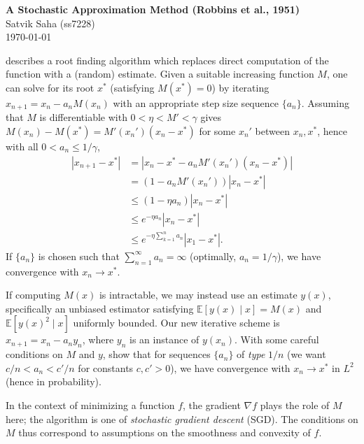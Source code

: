 \documentclass[12pt]{article}
\begin{document}
\begin{flushleft}
\textbf{A Stochastic Approximation Method (Robbins et al., 1951)} \\
Satvik Saha (ss7228) \\
\today
\end{flushleft}

\vspace{0.1in}


\cite{robbins51} describes a root finding algorithm which replaces direct
computation of the function with a (random) estimate.
Given a suitable increasing function $M$, one can solve for its root $x^*$
(satisfying $M(x^*) = 0$) by iterating $x_{n + 1} = x_n - a_n M(x_n)$ with an
appropriate step size sequence $\{a_n\}$.
Assuming that $M$ is differentiable with $0 < \eta < M' < \gamma$ gives $M(x_n)
- M(x^*) = M'(x_n')(x_n - x^*)$ for some $x_n'$ between $x_n, x^*$, hence with
all $0 < a_n \leq 1 /\gamma$,
\begin{align*}
    |x_{n + 1} - x^*|
        &= |x_n - x^* - a_n M'(x_n')(x_n - x^*)| \\
        &= (1 - a_n M'(x_n')) |x_n - x^*| \\
        &\leq (1 - \eta a_n) |x_n - x^*| \\
        &\leq e^{-\eta a_n} |x_n - x^*| \\
        &\leq e^{-\eta\sum_{k = 1}^n a_n} |x_1 - x^*|.
\end{align*}
If $\{a_n\}$ is chosen such that $\sum_{n = 1}^\infty a_n = \infty$ (optimally,
$a_n = 1 /\gamma$), we have convergence with $x_n \to x^*$.

If computing $M(x)$ is intractable, we may instead use an estimate $y(x)$,
specifically an unbiased estimator satisfying $\mathbb{E}[y(x) \mid x] = M(x)$
and $\mathbb{E}[y(x)^2 \mid x]$ uniformly bounded.
Our new iterative scheme is $x_{n + 1} = x_n - a_n y_n$, where $y_n$ is an
instance of $y(x_n)$.
With some careful conditions on $M$ and $y$, \cite{robbins51} show that for
sequences $\{a_n\}$ of \emph{type} $1 /n$ (we want $c /n < a_n < c' /n$ for
constants $c, c' > 0$), we have convergence with $x_n \to x^*$ in $L^2$ (hence
in probability).

In the context of minimizing a function $f$, the gradient $\nabla{f}$ plays the
role of $M$ here; the algorithm is one of \emph{stochastic gradient descent}
(SGD).
The conditions on $M$ thus correspond to assumptions on the smoothness and
convexity of $f$.
\end{document}
